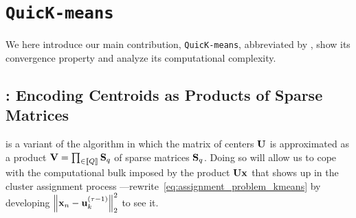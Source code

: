 
\section{\texttt{QuicK-means}}
\label{sec:contribution}

We here introduce our main contribution, \texttt{QuicK-means}, abbreviated by \qkmeans, 
show its convergence property and analyze its computational complexity.


\subsection{\qkmeans: Encoding Centroids as Products of Sparse Matrices}
\label{sec:qkmeans:algo}

\qkmeans is a variant of the \kmeans algorithm in which the matrix of centers ${\mathbf{U}}$
is approximated as a product ${\mathbf{V}}=\prod_{\in\left \llbracket Q\right \rrbracket}{\mathbf{S}}_q$ of sparse matrices ${\mathbf{S}}_q$.
Doing so will allow us to cope with the computational bulk imposed by the product ${\mathbf{U}}{\mathbf{x}}$
that shows up in the cluster assignment process ---rewrite~\eqref{eq:assignment_problem_kmeans}
 by developing $\left\|{\mathbf{x}}_{n} - {\mathbf{u}}_{k}^{(\tau-1)}\right\|_2^2$ to see it.

